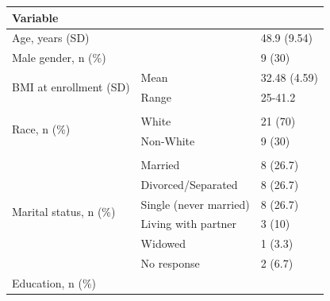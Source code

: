 \documentclass[preprint,12pt]{elsarticle}
\begin{document}
\begin{table}[H]
\begin{tabular}{|l|l|l|}
\hline
Variable                                   &                                          &              \\ \hline
Age, years (SD)                            &                                          & 48.9 (9.54)  \\ \hline
Male gender, n (\%)                        &                                          & 9 (30)       \\ \hline
\multirow{2}{*}{BMI at enrollment (SD)}    & Mean                                     & 32.48 (4.59) \\ \cline{2-3} 
                                           & Range                                    & 25-41.2      \\ \hline
\multirow{3}{*}{Race, n (\%)}              &                                          &              \\ \cline{2-3} 
                                           & White                                    & 21 (70)      \\ \cline{2-3} 
                                           & Non-White                                & 9 (30)       \\ \hline
\multirow{7}{*}{Marital status, n (\%)}    &                                          &              \\ \cline{2-3} 
                                           & Married                                  & 8 (26.7)     \\ \cline{2-3} 
                                           & Divorced/Separated                       & 8 (26.7)     \\ \cline{2-3} 
                                           & Single (never married)                   & 8 (26.7)     \\ \cline{2-3} 
                                           & Living with partner                      & 3 (10)       \\ \cline{2-3} 
                                           & Widowed                                  & 1 (3.3)      \\ \cline{2-3} 
                                           & No response                              & 2 (6.7)      \\ \hline
\multirow{8}{*}{Education, n (\%)}         &                                          &              \\ \cline{2-3} 

\end{tabular}
\end{table}
\end{document}
